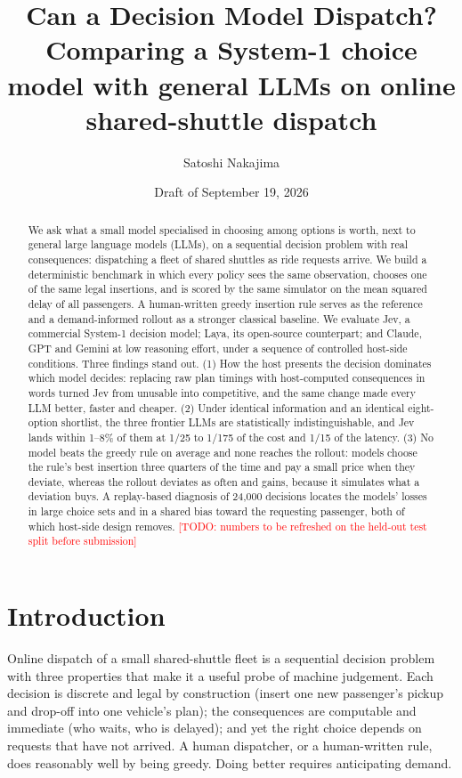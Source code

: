 \documentclass[11pt]{article}
\title{Can a Decision Model Dispatch? \\
\large Comparing a System-1 choice model with general LLMs on online shared-shuttle dispatch}
\author{
Satoshi Nakajima \\ \todo{affiliation}
\and
\todo{co-authors}
}
\date{Draft of September 19, 2026}
\newcommand{\todo}[1]{\textcolor{red}{[TODO: #1]}}
\begin{document}
\maketitle

\begin{abstract}
We ask what a small model specialised in choosing among options is worth, next to general large language models (LLMs), on a sequential decision problem with real consequences: dispatching a fleet of shared shuttles as ride requests arrive. We build a deterministic benchmark in which every policy sees the same observation, chooses one of the same legal insertions, and is scored by the same simulator on the mean squared delay of all passengers. A human-written greedy insertion rule serves as the reference and a demand-informed rollout as a stronger classical baseline. We evaluate Jev, a commercial System-1 decision model; Laya, its open-source counterpart; and Claude, GPT and Gemini at low reasoning effort, under a sequence of controlled host-side conditions. Three findings stand out. (1) How the host presents the decision dominates which model decides: replacing raw plan timings with host-computed consequences in words turned Jev from unusable into competitive, and the same change made every LLM better, faster and cheaper. (2) Under identical information and an identical eight-option shortlist, the three frontier LLMs are statistically indistinguishable, and Jev lands within 1--8\% of them at 1/25 to 1/175 of the cost and 1/15 of the latency. (3) No model beats the greedy rule on average and none reaches the rollout: models choose the rule's best insertion three quarters of the time and pay a small price when they deviate, whereas the rollout deviates as often and gains, because it simulates what a deviation buys. A replay-based diagnosis of 24{,}000 decisions locates the models' losses in large choice sets and in a shared bias toward the requesting passenger, both of which host-side design removes. \todo{numbers to be refreshed on the held-out test split before submission}
\end{abstract}

\section{Introduction}

Online dispatch of a small shared-shuttle fleet is a sequential decision problem with three properties that make it a useful probe of machine judgement. Each decision is discrete and legal by construction (insert one new passenger's pickup and drop-off into one vehicle's plan); the consequences are computable and immediate (who waits, who is delayed); and yet the right choice depends on requests that have not arrived. A human dispatcher, or a human-written rule, does reasonably well by being greedy. Doing better requires anticipating demand.
\end{document}
